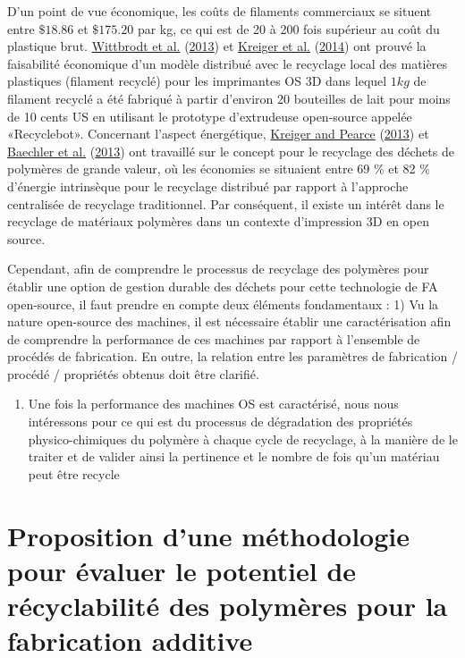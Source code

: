 \documentclass[
]{article}
\providecommand{\tightlist}{%
  \setlength{\itemsep}{0pt}\setlength{\parskip}{0pt}}
\begin{document}
D'un point de vue économique, les coûts de filaments commerciaux se situent entre \(\$18.86\) et \(\$175.20\) par kg, ce qui est de 20 à 200 fois supérieur au coût du plastique brut.
\protect\hyperlink{ref-Wittbrodt2013}{Wittbrodt et al.} (\protect\hyperlink{ref-Wittbrodt2013}{2013}) et \protect\hyperlink{ref-Kreiger2014}{Kreiger et al.} (\protect\hyperlink{ref-Kreiger2014}{2014}) ont prouvé la faisabilité économique d'un modèle distribué avec le recyclage local des matières plastiques (filament recyclé) pour les imprimantes OS 3D dans lequel \(1 kg\) de filament recyclé a été fabriqué à partir d'environ 20 bouteilles de lait pour moins de 10 cents US en utilisant le prototype d'extrudeuse open-source appelée «Recyclebot».
Concernant l'aspect énergétique, \protect\hyperlink{ref-Kreiger2013}{Kreiger and Pearce} (\protect\hyperlink{ref-Kreiger2013}{2013}) et \protect\hyperlink{ref-Baechler2013}{Baechler et al.} (\protect\hyperlink{ref-Baechler2013}{2013}) ont travaillé sur le concept pour le recyclage des déchets de polymères de grande valeur, où les économies se situaient entre 69 \% et 82 \% d'énergie intrinsèque pour le recyclage distribué par rapport à l'approche centralisée de recyclage traditionnel.
Par conséquent, il existe un intérêt dans le recyclage de matériaux polymères dans un contexte d'impression 3D en open source.

Cependant, afin de comprendre le processus de recyclage des polymères pour établir une option de gestion durable des déchets pour cette technologie de FA open-source, il faut prendre en compte deux éléments fondamentaux :
1) Vu la nature open-source des machines, il est nécessaire établir une caractérisation afin de comprendre la performance de ces machines par rapport à l'ensemble de procédés de fabrication.
En outre, la relation entre les paramètres de fabrication / procédé / propriétés obtenus doit être clarifié.

\begin{enumerate}
\def\labelenumi{\arabic{enumi})}
\setcounter{enumi}{1}
\tightlist
\item
  Une fois la performance des machines OS est caractérisé, nous nous intéressons pour ce qui est du processus de dégradation des propriétés physico-chimiques du polymère à chaque cycle de recyclage, à la manière de le traiter et de valider ainsi la pertinence et le nombre de fois qu'un matériau peut être recycle
\end{enumerate}

\hypertarget{muxe9thodologie-pour-recycler-des-polymuxe8res-pour-la-fabrication-additive}{%
\section{Proposition d'une méthodologie pour évaluer le potentiel de récyclabilité des polymères pour la fabrication additive}\label{muxe9thodologie-pour-recycler-des-polymuxe8res-pour-la-fabrication-additive}}
\end{document}

